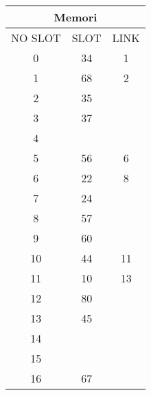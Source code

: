 \documentclass[12pt,a4paper]{article}
\begin{document}
\begin{enumerate}
\begin{multicols}{2}
      \begin{center}
        \begin{adjustbox}{scale=1,center}
          \begin{tabular}{ |c|c|c| } 
            \hline \multicolumn{3}{|c|}{Memori} \\ \hline \hline 
            NO SLOT & SLOT & LINK \\ \hline \hline
            0       & 34   &  1   \\ \hline
            1       & 68   &  2   \\ \hline
            2       & 35   &      \\ \hline
            3       & 37   &      \\ \hline
            4       &      &      \\ \hline
            5       & 56   &  6   \\ \hline
            6       & 22   &  8   \\ \hline
            7       & 24   &      \\ \hline
            8       & 57   &      \\ \hline
            9       & 60   &      \\ \hline
            10      & 44   &  11  \\ \hline
            11      & 10   &  13  \\ \hline
            12      & 80   &      \\ \hline
            13      & 45   &      \\ \hline
            14      &      &      \\ \hline
            15      &      &      \\ \hline
            16      & 67   &      \\ \hline
          \end{tabular}
        \end{adjustbox}
      \end{center}


\end{multicols}
\end{enumerate}
\end{document}
